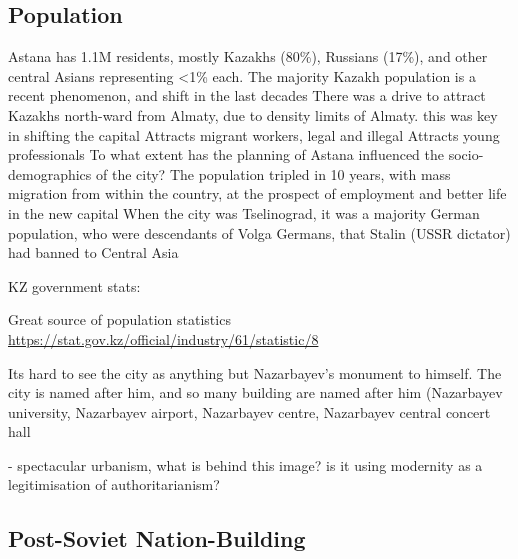 \documentclass{article}
\begin{document}
\subsection{Population}

\begin{outline}
  \1 Astana has 1.1M residents, mostly Kazakhs (80\%), Russians (17\%), and other central Asians representing <1\% each. The majority Kazakh population is a recent phenomenon, and shift in the last decades
  \1 There was a drive to attract Kazakhs north-ward from Almaty, due to density limits of Almaty. this was key in shifting the capital
  \1 Attracts migrant workers, legal and illegal
  \1 Attracts young professionals
  \1 To what extent has the planning of Astana influenced the socio-demographics of the city?
  \1 The population tripled in 10 years, with mass migration from within the country, at the prospect of employment and better life in the new capital \cite{laszczkowski2011building}
  \1 When the city was Tselinograd, it was a majority German population, who were descendants of Volga Germans, that Stalin (USSR dictator) had banned to Central Asia 
\end{outline}

KZ government stats:

\begin{outline}
  \1 Great source of population statistics \url{https://stat.gov.kz/official/industry/61/statistic/8} 
\end{outline}

Its hard to see the city as anything but Nazarbayev's monument to himself. The city is named after him, and so many building are named after him (Nazarbayev university, Nazarbayev airport, Nazarbayev centre, Nazarbayev central concert hall

- spectacular urbanism, what is behind this image? is it using modernity as a legitimisation of authoritarianism?

\subsection{Post-Soviet Nation-Building}
\end{document}
